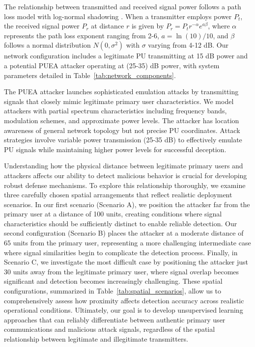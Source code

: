\documentclass[pdflatex,sn-mathphys-num]{sn-jnl}%
\theoremstyle{thmstyleone}
\theoremstyle{thmstyletwo}
\theoremstyle{thmstylethree}
\begin{document}
The relationship between transmitted and received signal power follows a path loss model with log-normal shadowing \cite{ref26}. When a transmitter employs power $P_t$, the received signal power $P_r$ at distance $r$ is given by $P_r = P_t r^{-\alpha} e^{a\beta}$, where $\alpha$ represents the path loss exponent ranging from 2-6, $a = \ln(10)/10$, and $\beta$ follows a normal distribution $N(0, \sigma^2)$ with $\sigma$ varying from 4-12 dB. Our network configuration includes a legitimate PU transmitting at 15 dB power and a potential PUEA attacker operating at (25-35) dB power, with system parameters detailed in Table~\ref{tab:network_components}.

The PUEA attacker launches sophisticated emulation attacks by transmitting signals that closely mimic legitimate primary user characteristics. We model attackers with partial spectrum characteristics including frequency bands, modulation schemes, and approximate power levels. The attacker has location awareness of general network topology but not precise PU coordinates. Attack strategies involve variable power transmission (25-35 dB) to effectively emulate PU signals while maintaining higher power levels for successful deception.

Understanding how the physical distance between legitimate primary users and attackers affects our ability to detect malicious behavior is crucial for developing robust defense mechanisms. To explore this relationship thoroughly, we examine three carefully chosen spatial arrangements that reflect realistic deployment scenarios. In our first scenario (Scenario A), we position the attacker far from the primary user at a distance of 100 units, creating conditions where signal characteristics should be sufficiently distinct to enable reliable detection. Our second configuration (Scenario B) places the attacker at a moderate distance of 65 units from the primary user, representing a more challenging intermediate case where signal similarities begin to complicate the detection process. Finally, in Scenario C, we investigate the most difficult case by positioning the attacker just 30 units away from the legitimate primary user, where signal overlap becomes significant and detection becomes increasingly challenging. These spatial configurations, summarized in Table~\ref{tab:spatial_scenarios}, allow us to comprehensively assess how proximity affects detection accuracy across realistic operational conditions. Ultimately, our goal is to develop unsupervised learning approaches that can reliably differentiate between authentic primary user communications and malicious attack signals, regardless of the spatial relationship between legitimate and illegitimate transmitters.
\end{document}
